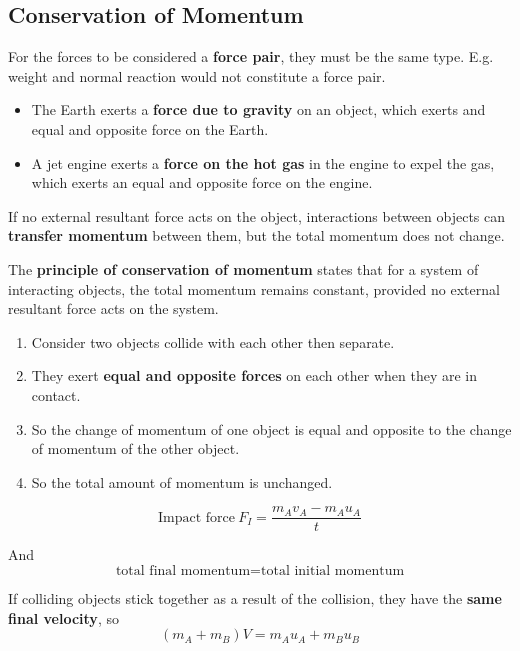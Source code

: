 \subsection{Conservation of Momentum}

For the forces to be considered a \textbf{force pair}, they must be the same type. E.g. weight and normal reaction would not constitute a force pair.
\begin{itemize}
    \item The Earth exerts a \textbf{force due to gravity} on an object, which exerts and equal and opposite force on the Earth.
    \item A jet engine exerts a \textbf{force on the hot gas} in the engine to expel the gas, which exerts an equal and opposite force on the engine.
\end{itemize}

If no external resultant force acts on the object, interactions between objects can \textbf{transfer momentum} between them, but the total momentum does not change.

The \textbf{principle of conservation of momentum} states that for a system of interacting objects, the total momentum remains constant, provided no external resultant force acts on the system.
\begin{enumerate}
    \item Consider two objects collide with each other then separate.
    \item They exert \textbf{equal and opposite forces} on each other when they are in contact.
    \item So the change of momentum of one object is equal and opposite to the change of momentum of the other object.
    \item So the total amount of momentum is unchanged.
\end{enumerate}
$$\text{Impact force}\ F_I=\frac{m_Av_A-m_Au_A}{t}$$

And
$$\text{total final momentum}=\text{total initial momentum}$$

If colliding objects stick together as a result of the collision, they have the \textbf{same final velocity}, so
$$(m_A+m_B)V=m_Au_A+m_Bu_B$$
